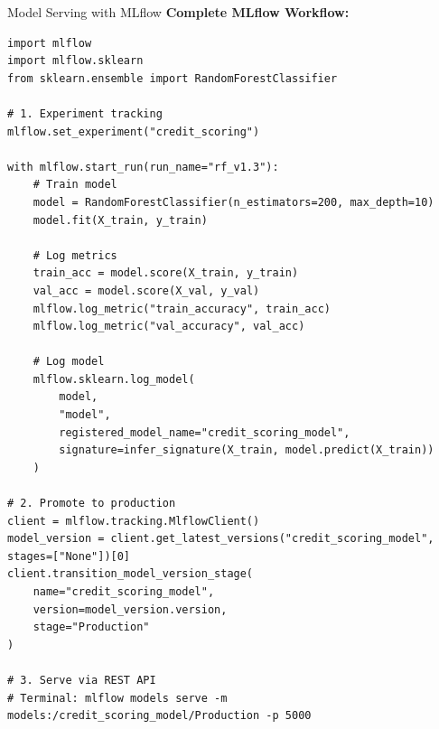 \begin{frame}[fragile]{Model Serving with MLflow}
\textbf{Complete MLflow Workflow:}
\begin{lstlisting}[basicstyle=\ttfamily\tiny]
import mlflow
import mlflow.sklearn
from sklearn.ensemble import RandomForestClassifier

# 1. Experiment tracking
mlflow.set_experiment("credit_scoring")

with mlflow.start_run(run_name="rf_v1.3"):
    # Train model
    model = RandomForestClassifier(n_estimators=200, max_depth=10)
    model.fit(X_train, y_train)

    # Log metrics
    train_acc = model.score(X_train, y_train)
    val_acc = model.score(X_val, y_val)
    mlflow.log_metric("train_accuracy", train_acc)
    mlflow.log_metric("val_accuracy", val_acc)

    # Log model
    mlflow.sklearn.log_model(
        model,
        "model",
        registered_model_name="credit_scoring_model",
        signature=infer_signature(X_train, model.predict(X_train))
    )

# 2. Promote to production
client = mlflow.tracking.MlflowClient()
model_version = client.get_latest_versions("credit_scoring_model", stages=["None"])[0]
client.transition_model_version_stage(
    name="credit_scoring_model",
    version=model_version.version,
    stage="Production"
)

# 3. Serve via REST API
# Terminal: mlflow models serve -m models:/credit_scoring_model/Production -p 5000
\end{lstlisting}
\end{frame}

